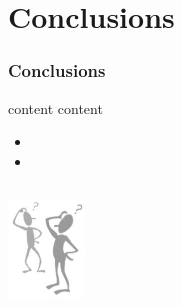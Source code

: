 \documentclass{beamer}
\begin{document}

\section{Conclusions}
\begin{frame}[allowframebreaks] \frametitle{Conclusions}
  content
  \newpage
  content
  \newpage
\end{frame}


\begin{frame}
  
  \begin{itemize}
  \item
  \item 
  \end{itemize}

  
  \begin{columns}
    \column{6cm}
    \begin{block}{}
      \centerline{ 
        \includegraphics[width=0.5\textwidth]{figures/questions.png} 
      }
    \end{block}
  \end{columns}
  
\end{frame}
\end{document}

